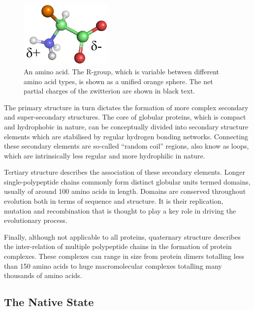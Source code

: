 \begin{figure}[hptb]
\begin{center}
\includegraphics[width=0.40\textwidth]{./01-ProteinStructure/aminoacid/aminoacid.png}
\caption[An amino acid]{An amino acid. The R-group, which is variable between different amino acid types, is shown as a unified orange sphere. The net partial charges of the zwitterion
are shown in black text.}
\label{fig:intro:aminoa}
\end{center}
\end{figure}

The primary structure in turn dictates the formation of more complex secondary
and super-secondary structures. The core of globular proteins, which is compact and hydrophobic in nature, can be conceptually divided into  secondary structure elements which are stabilised by regular hydrogen bonding networks. Connecting these secondary elements are so-called ``random coil'' regions, also know as loops, which are intrinsically less regular
and more hydrophilic in nature.

Tertiary structure describes the association of these secondary elements. Longer single-polypeptide chains commonly form distinct globular
units termed domains, usually of around 100 amino acids in length. Domains are conserved throughout evolution both in terms of sequence and structure. It is their replication, mutation and recombination that
is thought to play a key role in driving the evolutionary process\cite{NATIVE:SUPERFAMILY:2007}. 

Finally, although not applicable to all proteins, quaternary structure describes the inter-relation of multiple polypeptide chains
 in the formation of protein complexes. These complexes can range in size from protein dimers totalling less than 150 amino acids to huge macromolecular complexes totalling many thousands of amino acids.



\subsection{The Native State} 


